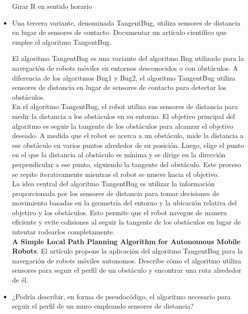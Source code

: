 \documentclass{article}
\begin{document}
\begin{itemize}
\begin{algorithm}
{{{{{            }
          }{
            Girar R en sentido horario\;
          }
        }
      }
    }
    
  \end{algorithm}
  
  \newpage
\item Una tercera variante, denominada TangentBug, utiliza sensores de distancia en lugar de sensores de contacto. Documentar un artículo científico que emplee el algoritmo TangentBug.

  El algoritmo TangentBug es una variante del algoritmo Bug utilizado para la navegación de robots móviles en entornos desconocidos o con obstáculos. A diferencia de los algoritmos Bug1 y Bug2, el algoritmo TangentBug utiliza sensores de distancia en lugar de sensores de contacto para detectar los obstáculos.\\

  En el algoritmo TangentBug, el robot utiliza sus sensores de distancia para medir la distancia a los obstáculos en su entorno. El objetivo principal del algoritmo es seguir la tangente de los obstáculos para alcanzar el objetivo deseado. A medida que el robot se acerca a un obstáculo, mide la distancia a ese obstáculo en varios puntos alrededor de su posición. Luego, elige el punto en el que la distancia al obstáculo es mínima y se dirige en la dirección perpendicular a ese punto, siguiendo la tangente del obstáculo. Este proceso se repite iterativamente mientras el robot se mueve hacia el objetivo.\\

  La idea central del algoritmo TangentBug es utilizar la información proporcionada por los sensores de distancia para tomar decisiones de movimiento basadas en la geometría del entorno y la ubicación relativa del objetivo y los obstáculos. Esto permite que el robot navegue de manera eficiente y evite colisiones al seguir la tangente de los obstáculos en lugar de intentar rodearlos completamente.\\

  \textbf{A Simple Local Path Planning Algorithm for Autonomous Mobile Robots}. El artículo propone la aplicación del algoritmo TangentBug para la navegación de robots móviles autonomos. Describe cómo el algoritmo utiliza sensores para seguir el perfil de un obstáculo y encontrar una ruta alrededor de él.

  \newpage
\item ¿Podría describir, en forma de pseudocódigo, el algoritmo necesario para seguir el perfil de un muro empleando sensores de distancia?


\end{itemize}
\end{document}
